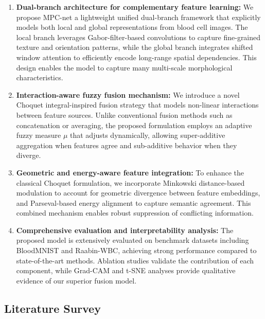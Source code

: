 \documentclass[preprint,12pt]{elsarticle}
\begin{document}
\begin{enumerate}

\item \textbf{Dual-branch architecture for complementary feature learning:}  
We propose MPC-net a lightweight unified dual-branch framework that explicitly models both local and global representations from blood cell images. The local branch leverages Gabor-filter-based convolutions to capture fine-grained texture and orientation patterns, while the global branch integrates shifted window attention to efficiently encode long-range spatial dependencies. This design enables the model to capture many multi-scale morphological characteristics.

\item \textbf{Interaction-aware fuzzy fusion mechanism:}  
We introduce a novel Choquet integral-inspired fusion strategy that models non-linear interactions between feature sources. Unlike conventional fusion methods such as concatenation or averaging, the proposed formulation employs an adaptive fuzzy measure $\mu$ that adjusts dynamically, allowing super-additive aggregation when features agree and sub-additive behavior when they diverge.

\item \textbf{Geometric and energy-aware feature integration:}  
To enhance the classical Choquet formulation, we incorporate Minkowski distance-based modulation to account for geometric divergence between feature embeddings, and Parseval-based energy alignment to capture semantic agreement. This combined mechanism enables robust suppression of conflicting information.

\item \textbf{Comprehensive evaluation and interpretability analysis:}  
The proposed model is extensively evaluated on benchmark datasets including BloodMNIST and Raabin-WBC, achieving strong performance compared to state-of-the-art methods. Ablation studies validate the contribution of each component, while Grad-CAM and t-SNE analyses provide qualitative evidence of our superior fusion model.

\end{enumerate}

\subsection{Literature Survey}
\end{document}
